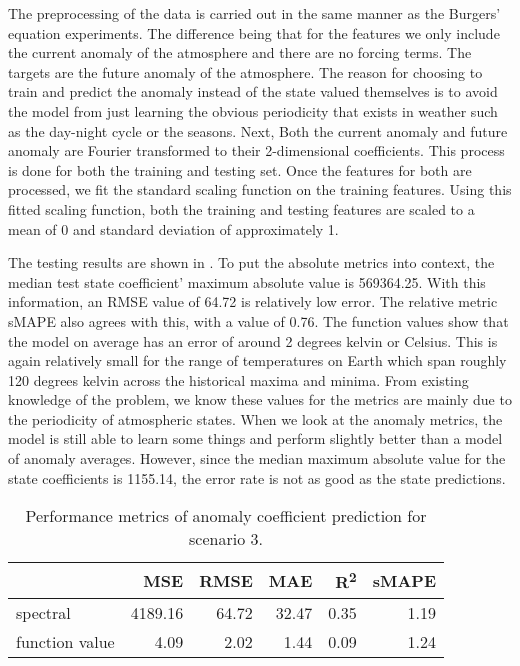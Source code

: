 The preprocessing of the data is carried out in the same manner as the Burgers' equation experiments. The difference being that for the features we only include the current anomaly of the atmosphere and there are no forcing terms. The targets are the future anomaly of the atmosphere. The reason for choosing to train and predict the anomaly instead of the state valued themselves is to avoid the model from just learning the obvious periodicity that exists in weather such as the day-night cycle or the seasons. Next, Both the current anomaly and future anomaly are Fourier transformed to their 2-dimensional coefficients. This process is done for both the training and testing set. Once the features for both are processed, we fit the standard scaling function on the training features. Using this fitted scaling function, both the training and testing features are scaled to a mean of 0 and standard deviation of approximately 1.

The testing results are shown in . To put the absolute metrics into context, the median test state coefficient' maximum absolute value is \num{569364.25}. With this information, an RMSE value of 64.72 is relatively low error. The relative metric sMAPE also agrees with this, with a value of 0.76. The function values show that the model on average has an error of around 2 degrees kelvin or Celsius. This is again relatively small for the range of temperatures on Earth which span roughly 120 degrees kelvin across the historical maxima and minima. From existing knowledge of the problem, we know these values for the metrics are mainly due to the periodicity of atmospheric states. When we look at the anomaly metrics, the model is still able to learn some things and perform slightly better than a model of anomaly averages. However, since the median maximum absolute value for the state coefficients is \num{1155.14}, the error rate is not as good as the state predictions.
\begin{table}[H]
  \caption{Performance metrics of anomaly coefficient prediction for scenario 3.}\label{table:sc3_test_anomaly_metrics}
  \centering
  \begin{tabular}{lrrrrr}
    \toprule
                   & MSE     & RMSE  & MAE   & R\textsuperscript{2} & sMAPE \\
    \midrule
    spectral       & 4189.16 & 64.72 & 32.47 & 0.35                 & 1.19  \\
    function value & 4.09    & 2.02  & 1.44  & 0.09                 & 1.24  \\
    \bottomrule
  \end{tabular}
\end{table}

